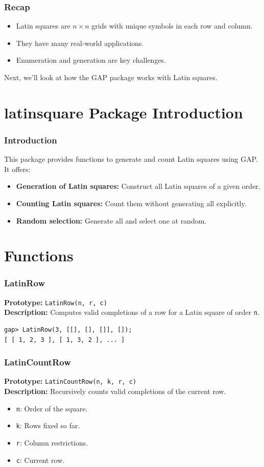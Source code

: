 \documentclass{beamer}
\begin{document}
\begin{frame}
\frametitle{Recap}
\begin{itemize}
  \item Latin squares are $n \times n$ grids with unique symbols in each row and column.
  \item They have many real-world applications.
  \item Enumeration and generation are key challenges.
\end{itemize}
Next, we'll look at how the GAP package works with Latin squares.
\end{frame}

\section{latinsquare Package Introduction}
\begin{frame}
\frametitle{Introduction}
This package provides functions to generate and count Latin squares using GAP. It offers:
\begin{itemize}
  \item \textbf{Generation of Latin squares:} Construct all Latin squares of a given order.
  \item \textbf{Counting Latin squares:} Count them without generating all explicitly.
  \item \textbf{Random selection:} Generate all and select one at random.
\end{itemize}
\end{frame}

\section{Functions}
\begin{frame}[fragile]
\frametitle{LatinRow}
\textbf{Prototype:} \texttt{LatinRow(n, r, c)}\\
\textbf{Description:} Computes valid completions of a row for a Latin square of order \texttt{n}.
\begin{lstlisting}
gap> LatinRow(3, [[], [], []], []);
[ [ 1, 2, 3 ], [ 1, 3, 2 ], ... ]
\end{lstlisting}
\end{frame}

\begin{frame}[fragile]
\frametitle{LatinCountRow}
\textbf{Prototype:} \texttt{LatinCountRow(n, k, r, c)}\\
\textbf{Description:} Recursively counts valid completions of the current row.
\begin{itemize}
  \item \texttt{n}: Order of the square.
  \item \texttt{k}: Rows fixed so far.
  \item \texttt{r}: Column restrictions.
  \item \texttt{c}: Current row.
\end{itemize}
\end{frame}
\end{document}
